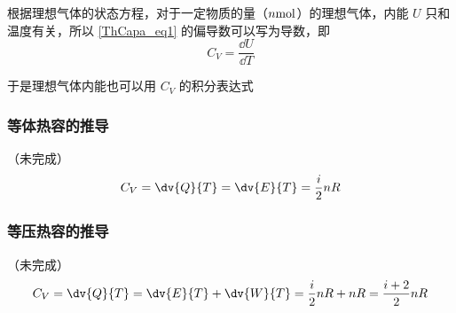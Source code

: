 根据理想气体的状态方程，对于一定物质的量（$n \rm{mol}$）的理想气体，内能 $U$ 只和温度有关，所以 \autoref{ThCapa_eq1} 的偏导数可以写为导数，即
\begin{equation}
C_V=\frac{\dd U}{\dd T}
\end{equation}

于是理想气体内能也可以用 $C_V$ 的积分表达式

\subsubsection{等体热容的推导}
（未完成）
\begin{equation}
C_V = \dv{Q}{T} = \dv{E}{T} = \frac{i}{2} nR
\end{equation}

\subsubsection{等压热容的推导}
（未完成）
\begin{equation}
C_V = \dv{Q}{T} = \dv{E}{T} + \dv{W}{T} = \frac{i}{2} nR + nR = \frac{i+2}{2} nR
\end{equation}

